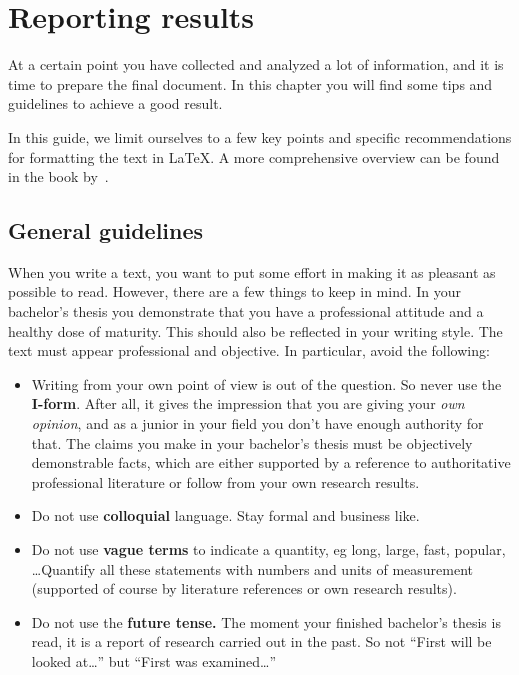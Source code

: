 \chapter{Reporting results}
\label{ch:reportingresults}

%

At a certain point you have collected and analyzed a lot of information, and it is time to prepare the final document. In this chapter you will find some tips and guidelines to achieve a good result.

In this guide, we limit ourselves to a few key points and specific recommendations for formatting the text in {\LaTeX}. A more comprehensive overview can be found in the book by~\textcite{Pollefliet2011}.

\section{General guidelines}
\label{ch:generalguidenlines}

When you write a text, you want to put some effort in making it as pleasant as possible to read. However, there are a few things to keep in mind. In your bachelor's thesis you demonstrate that you have a professional attitude and a healthy dose of maturity. This should also be reflected in your writing style. The text must appear professional and objective. In particular, avoid the following:

\begin{itemize}
  \item Writing from your own point of view is out of the question. So never use the \textbf{I-form}. After all, it gives the impression that you are giving your \emph{own opinion}, and as a junior in your field you don't have enough authority for that. The claims you make in your bachelor's thesis must be objectively demonstrable facts, which are either supported by a reference to authoritative professional literature or follow from your own research results.
  \item Do not use \textbf{colloquial} language.  Stay formal and business like.
  \item Do not use \textbf{vague terms} to indicate a quantity, eg long, large, fast, popular, \ldots Quantify all these statements with numbers and units of measurement (supported of course by literature references or own research results).
  \item Do not use the \textbf{future tense.} The moment your finished bachelor's thesis is read, it is a report of research carried out in the past. So not ``First will be looked at\ldots'' but ``First was examined\ldots''
\end{itemize}

